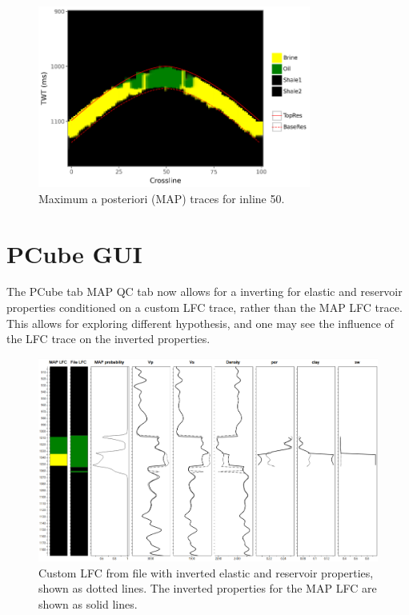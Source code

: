 \documentclass[note,screen,english,12pt,utf8]{nrdoc}
\begin{document}
\begin{figure}[h]
    \centering
    \includegraphics[width=0.8\textwidth]{figures/map_traces.png}
    \caption{Maximum a posteriori (MAP) traces for inline 50.}
    \label{fig:map_traces}
\end{figure}


\section{PCube GUI}

The PCube tab MAP QC tab now allows for a inverting for elastic and reservoir properties
conditioned on a custom LFC trace, rather than the MAP LFC trace. This allows for exploring
different hypothesis, and one may see the influence of the LFC trace on the inverted properties.

\begin{figure}[h]
    \centering
    \includegraphics[width=\textwidth]{figures/gui_property_inversion_tab_il57_xl62_file.png}
    \caption{Custom LFC from file with inverted elastic and reservoir properties, shown as dotted lines.
        The inverted properties for the MAP LFC are shown as solid lines.
    }
    \label{fig:custom_lfc_property_inversion_tab}
\end{figure}
\end{document}
